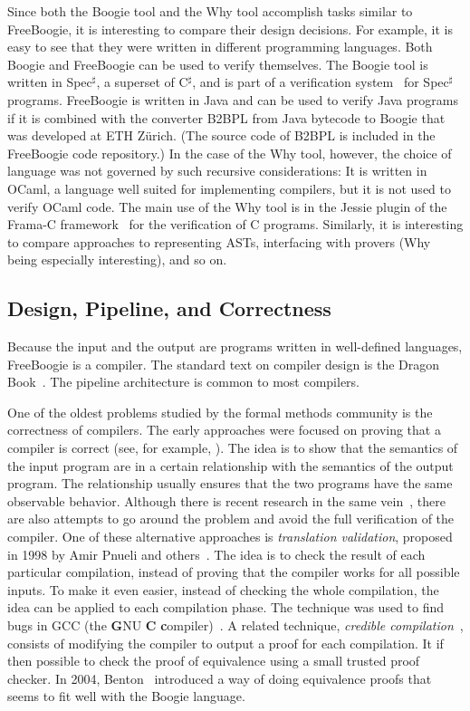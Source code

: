 \documentclass{llncs}
\def\fb#1{{\bf #1}} %
\newcommand{\csharp}{C$^\sharp$\xspace}
\newcommand{\specsharp}{Spec$^\sharp$\xspace}
\begin{document}
Since both the Boogie tool and the Why tool accomplish tasks
similar to FreeBoogie, it is interesting to compare their design
decisions. For example, it is easy to see that they were written
in different programming languages. Both Boogie and FreeBoogie
can be used to verify themselves. The Boogie tool is written in
\specsharp, a superset of \csharp, and is part of a verification
system~\cite{barnett2005spec} for \specsharp programs. FreeBoogie
is written in Java and can be used to verify Java programs if it
is combined with the converter B2BPL from Java bytecode to Boogie
that was developed at ETH Z\"urich. (The source code of B2BPL
is included in the FreeBoogie code repository.) In the case of
the Why tool, however, the choice of language was not governed
by such recursive considerations: It is written in OCaml, a
language well suited for implementing compilers, but it is not
used to verify OCaml code. The main use of the Why tool is in
the Jessie plugin of the Frama-C framework~\cite{framac} for
the verification of C programs. Similarly, it is interesting to
compare approaches to representing ASTs, interfacing with provers
(Why being especially interesting), and so on.

\subsection{Design, Pipeline, and Correctness} %

Because the input and the output are programs written in
well-defined languages, FreeBoogie is a compiler. The standard
text on compiler design is the Dragon Book~\cite{aho2007}. The
pipeline architecture is common to most compilers.

One of the oldest problems studied by the formal methods
community is the correctness of compilers. The early approaches
were focused on proving that a compiler is correct (see, for
example, \cite{moore1989cc}). The idea is to show that the
semantics of the input program are in a certain relationship
with the semantics of the output program. The relationship
usually ensures that the two programs have the same observable
behavior. Although there is recent research in the same
vein~\cite{leroy2009}, there are also attempts to go around the
problem and avoid the full verification of the compiler. One of
these alternative approaches is \emph{translation validation},
proposed in 1998 by Amir Pnueli and others~\cite{pnueli1998tv}.
The idea is to check the result of each particular compilation,
instead of proving that the compiler works for all possible
inputs. To make it even easier, instead of checking the whole
compilation, the idea can be applied to each compilation phase.
The technique was used to find bugs in GCC (the \fb GNU \fb
C \fb compiler)~\cite{necula2000tv}. A related technique,
\emph{credible compilation}~\cite{rinard1999credible}, consists
of modifying the compiler to output a proof for each compilation.
It if then possible to check the proof of equivalence using a
small trusted proof checker. In 2004, Benton~\cite{benton2004}
introduced a way of doing equivalence proofs that seems to
fit well with the Boogie language.
\end{document}
